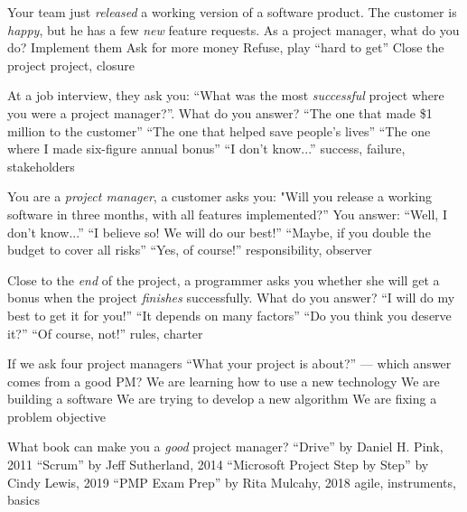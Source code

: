 \documentclass{article}
\begin{document}

\pmbaQuestion
  {Your team just \emph{released} a working version of a software product. The customer is \emph{happy}, but he has a few \emph{new} feature requests. As a project manager, what do you do?}
  {Implement them}
  {Ask for more money}
  {Refuse, play ``hard to get''}
  {Close the project}
  {project, closure}

\pmbaQuestion
  {At a job interview, they ask you: ``What was the most \emph{successful} project where you were a project manager?''. What do you answer?}
  {``The one that made \$1 million to the customer''}
  {``The one that helped save people's lives''}
  {``The one where I made six-figure annual bonus''}
  {``I don't know...''}
  {success, failure, stakeholders}

\pmbaQuestion
  {You are a \emph{project manager}, a customer asks you: "Will you release a working software in three months, with all features implemented?'' You answer:}
  {``Well, I don't know...''}
  {``I believe so! We will do our best!''}
  {``Maybe, if you double the budget to cover all risks''}
  {``Yes, of course!''}
  {responsibility, observer}

\pmbaQuestion
  {Close to the \emph{end} of the project, a programmer asks you whether she will get a bonus when the project \emph{finishes} successfully. What do you answer?}
  {``I will do my best to get it for you!''}
  {``It depends on many factors''}
  {``Do you think you deserve it?''}
  {``Of course, not!''}
  {rules, charter}

\pmbaQuestion
  {If we ask four project managers ``What your project is about?'' --- which answer comes from a good PM?}
  {We are learning how to use a new technology}
  {We are building a software}
  {We are trying to develop a new algorithm}
  {We are fixing a problem}
  {objective}

\pmbaQuestion
  {What book can make you a \emph{good} project manager?}
  {``Drive'' by Daniel H. Pink, 2011}
  {``Scrum'' by Jeff Sutherland, 2014}
  {``Microsoft Project Step by Step'' by Cindy Lewis, 2019}
  {``PMP Exam Prep'' by Rita Mulcahy, 2018}
  {agile, instruments, basics}

\end{document}
